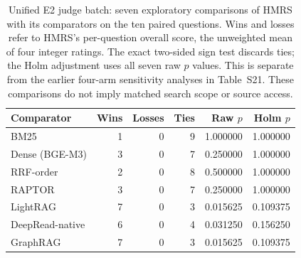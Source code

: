 \begin{table}[!t]
\centering\small
\caption{Unified E2 judge batch: seven exploratory comparisons of HMRS
with its comparators on the ten paired questions. Wins and losses refer to
HMRS's per-question overall score, the unweighted mean of four integer
ratings. The exact two-sided sign test discards ties; the Holm adjustment
uses all seven raw $p$ values. This is separate from the earlier four-arm
sensitivity analyses in Table~S21. These comparisons do not imply matched
search scope or source access.}
\label{tab:unified-holm}
\begin{tabular}{@{}lrrrrr@{}}
\toprule
Comparator & Wins & Losses & Ties & Raw $p$ & Holm $p$ \\
\midrule
BM25 & 1 & 0 & 9 & 1.000000 & 1.000000 \\
Dense (BGE-M3) & 3 & 0 & 7 & 0.250000 & 1.000000 \\
RRF-order & 2 & 0 & 8 & 0.500000 & 1.000000 \\
RAPTOR & 3 & 0 & 7 & 0.250000 & 1.000000 \\
LightRAG & 7 & 0 & 3 & 0.015625 & 0.109375 \\
DeepRead-native & 6 & 0 & 4 & 0.031250 & 0.156250 \\
GraphRAG & 7 & 0 & 3 & 0.015625 & 0.109375 \\
\bottomrule
\end{tabular}
\end{table}
